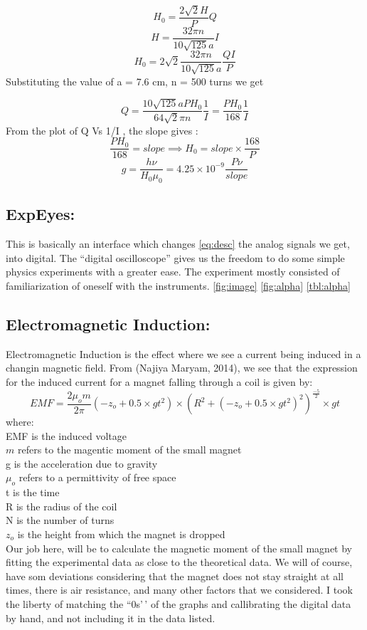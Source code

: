 \documentclass{ieeeconf}
\begin{document}
\[ H_0 = \frac{2\sqrt{2}H}{P}Q \]
\[ H=\frac{32\pi n}{10\sqrt{125}a}I \]
\[ H_0=2\sqrt{2}\frac{32\pi n}{10\sqrt{125}a}\frac{QI}{P} \]
Substituting the value of a = 7.6 cm, n = 500 turns we get

\begin{equation} Q=\frac{10\sqrt{125}a PH_0}{64\sqrt{2}\pi n }\frac{1}{I}=\frac{PH_0}{168}\frac{1}{I} \label{eq:desc}\end{equation}
From the plot of Q Vs 1/I , the slope gives :
\[ \frac{PH_0}{168}=slope \implies H_0=slope \times \frac{168}{P} \]
\[ g=\frac{h \nu}{H_0 \mu_0} = 4.25\times10^{-9} \frac{P \nu}{slope} \]

\subsection{ExpEyes:}

This is basically an interface which changes \ref{eq:desc} the analog signals we get, into digital. The ``digital oscilloscope'' gives us the freedom to do some simple physics experiments with a greater ease. The experiment mostly consisted of familiarization of oneself with the instruments. \ref{fig:image} \ref{fig:alpha} \ref{tbl:alpha}

\subsection{Electromagnetic Induction:}

Electromagnetic Induction is the effect where we see a current being induced in a changin magnetic field. From (Najiya Maryam, 2014), we see that the expression for the induced current for a magnet falling through a coil is given by:
\[ EMF = \frac{2\mu_o m}{2\pi}(-z_o+0.5\times gt^2) \times (R^2+(-z_o+0.5\times gt^2)^2)^\frac{-5}{2}\times gt \]
where:\\
EMF is the induced voltage\\
\(m\) refers to the magentic moment of the small magnet\\
g is the acceleration due to gravity\\
\(\mu_o\) refers to a permittivity of free space\\
t is the time\\
R is the radius of the coil\\
N is the number of turns\\
\(z_o\) is the height from which the magnet is dropped\\
Our job here, will be to calculate the magnetic moment of the small magnet by fitting the experimental data as close to the theoretical data. We will of course, have som deviations considering that the magnet does not stay straight at all times, there is air resistance, and many other factors that we considered. I took the liberty of matching the ``0s'\,' of the graphs and callibrating the digital data by hand, and not including it in the data listed.
\end{document}
